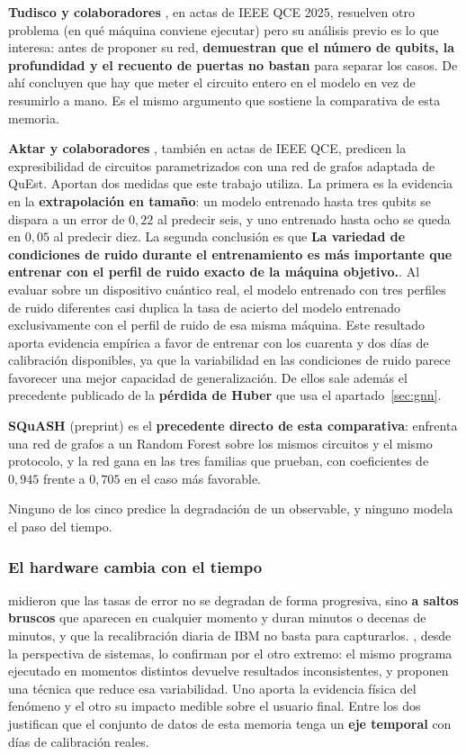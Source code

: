 \textbf{Tudisco y colaboradores} \cite{tudisco2025graph}, en actas de IEEE QCE 2025, resuelven
otro problema (en qué máquina conviene ejecutar) pero su análisis previo es lo que interesa:
antes de proponer su red, \textbf{demuestran que el número de qubits, la profundidad y el
recuento de puertas no bastan} para separar los casos. De ahí concluyen que hay que meter el circuito entero en el modelo en vez de
resumirlo a mano. Es el mismo argumento que sostiene la comparativa de esta memoria.

\textbf{Aktar y colaboradores} \cite{aktar2024graph}, también en actas de IEEE QCE, predicen la
expresibilidad de circuitos parametrizados con una red de grafos adaptada de QuEst. Aportan dos
medidas que este trabajo utiliza. La primera es la evidencia en la \textbf{extrapolación en tamaño}:
un modelo entrenado hasta tres qubits se dispara a un error de $0{,}22$ al predecir seis, y uno
entrenado hasta ocho se queda en $0{,}05$ al predecir diez. La segunda conclusión es que \textbf{La variedad de condiciones de ruido durante el entrenamiento es más importante que entrenar con el perfil de ruido exacto de la máquina objetivo.}. Al evaluar sobre un dispositivo cuántico real, el modelo entrenado con tres perfiles de ruido diferentes casi duplica la tasa de acierto del modelo entrenado exclusivamente con el perfil de ruido de esa misma máquina. Este resultado aporta evidencia empírica a favor de entrenar con los cuarenta y dos días de calibración disponibles, ya que la variabilidad en las condiciones de ruido parece favorecer una mejor capacidad de generalización. De ellos sale además el precedente publicado de
la \textbf{pérdida de Huber} que usa el apartado~\ref{sec:gnn}.

\textbf{SQuASH} \cite{martyniuk2025benchmarking} (preprint) es el \textbf{precedente directo de
esta comparativa}: enfrenta una red de grafos a un Random Forest sobre los mismos circuitos y el
mismo protocolo, y la red gana en las tres familias que prueban, con coeficientes de $0{,}945$
frente a $0{,}705$ en el caso más favorable.

Ninguno de los cinco predice la degradación de un observable, y ninguno modela el paso del
tiempo.

\subsubsection*{El hardware cambia con el tiempo}

 midieron que las tasas de error no se degradan de forma
progresiva, sino \textbf{a saltos bruscos} que aparecen en cualquier momento y duran
minutos o decenas de minutos, y que la recalibración diaria de IBM no basta para capturarlos.
, desde la perspectiva de sistemas, lo confirman por el otro extremo: el
mismo programa ejecutado en momentos distintos devuelve resultados inconsistentes, y proponen
una técnica que reduce esa variabilidad. Uno aporta la evidencia física del fenómeno y el otro
su impacto medible sobre el usuario final. Entre los dos justifican que el conjunto de datos de
esta memoria tenga un \textbf{eje temporal} con días de calibración reales.

